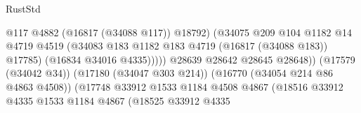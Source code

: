 \begin{lexlean}{RustStd}
\begin{coremodule}
{\begin{coremodule}
{{{{{{{{{{{{{{{{{{{{{{{{{{{{{{{{{{{{{{{{{{{{{{{{{{{{{{{                                                            @117
                                                            @4882
                                                            (@16817 (@34088 @117))
                                                            @18792)
                                                          (@34075
                                                            @209
                                                            @104
                                                            @1182
                                                            @14
                                                            @4719
                                                            @4519
                                                            (@34083
                                                              @183
                                                              @1182
                                                              @183
                                                              @4719
                                                              (@16817 (@34088 @183))
                                                              @17785)
                                                            (@16834 @34016 @4335)))))
                                                    @28639
                                                    @28642
                                                    @28645
                                                    @28648))
                                                (@17579 (@34042 @34))
                                                (@17180 (@34047 @303 @214))
                                                (@16770 (@34054 @214 @86 @4863 @4508))
                                                (@17748
                                                  @33912
                                                  @1533
                                                  @1184
                                                  @4508
                                                  @4867
                                                  (@18516
                                                    @33912
                                                    @4335
                                                    @1533
                                                    @1184
                                                    @4867
                                                    (@18525
                                                      @33912
                                                      @4335
}}}}}}}}}}}}}}}}}}}}}}}}}}}}}}}}}}}}}}}}}}}}}}}}}}}}}}}
\end{coremodule}}
\end{coremodule}
\end{lexlean}
